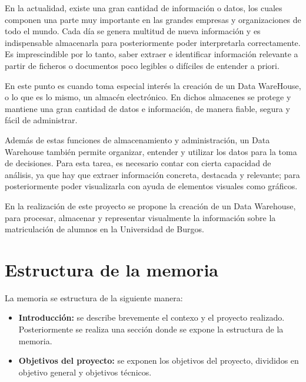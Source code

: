 

En la actualidad, existe una gran cantidad de información o datos, los cuales componen una parte muy importante en las grandes  empresas y organizaciones de todo el mundo.
Cada día se genera multitud de nueva información y es indispensable almacenarla para posteriormente poder interpretarla correctamente. Es imprescindible por lo tanto, saber extraer e identificar información relevante a partir de ficheros o documentos poco legibles o difíciles de entender a priori.


En este punto es cuando toma especial interés la creación de un Data WareHouse, o lo que es lo mismo, un almacén electrónico. En dichos almacenes se protege y mantiene una gran cantidad de datos e información, de manera fiable, segura y fácil de administrar.

Además de estas funciones de almacenamiento y administración, un Data Warehouse también permite organizar, entender y utilizar los datos para la toma de decisiones.
Para esta tarea, es necesario contar con cierta capacidad de análisis, ya que hay que extraer información concreta, destacada y relevante; para posteriormente poder visualizarla con ayuda de elementos visuales como gráficos.

En la realización de este proyecto se propone la creación de un Data Warehouse, para procesar, almacenar y representar visualmente la información sobre la matriculación de alumnos en la Universidad de Burgos. 



\section{Estructura de la memoria}\label{estructura-de-la-memoria}
La memoria se estructura de la siguiente manera:

\begin{itemize}
\item
\textbf{Introducción:} se describe brevemente el contexo y el proyecto realizado. Posteriormente se realiza una sección donde se expone la estructura de la memoria.
\item
\textbf{Objetivos del proyecto:} se exponen los objetivos del proyecto, divididos en objetivo general y objetivos técnicos.
\end{itemize}